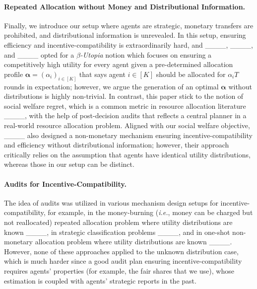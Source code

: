 \paragraph{Repeated Allocation without Money and Distributional Information.}
Finally, we introduce our setup where agents are strategic, monetary transfers are prohibited, and distributional information is unrevealed. In this setup, ensuring efficiency and incentive-compatibility is extraordinarily hard, and ____, ____, and ____ opted for a \textit{$\beta$-Utopia} notion which focuses on ensuring a competitively high utility for every agent given a pre-determined allocation profile $\bm \alpha=(\alpha_i)_{i\in [K]}$ that says agent $i\in [K]$ should be allocated for $\alpha_i T$ rounds in expectation; however, we argue the generation of an optimal $\bm \alpha$ without distributions is highly non-trivial. In contrast, this paper stick to the notion of social welfare regret, which is a common metric in resource allocation literature ____, with the help of post-decision audits that reflects a central planner in a real-world resource allocation problem. Aligned with our social welfare objective, ____ also designed a non-monetary mechanism ensuring incentive-compatibility and efficiency without distributional information; however, their approach critically relies on the assumption that agents have identical utility distributions, whereas those in our setup can be distinct.

\paragraph{Audits for Incentive-Compatibility.}
The idea of audits was utilized in various mechanism design setups for incentive-compatibility, for example, in the money-burning (\textit{i.e.}, money can be charged but not reallocated) repeated allocation problem where utility distributions are known ____, in strategic classification problems ____, and in one-shot non-monetary allocation problem where utility distributions are known ____. However, none of these approaches applied to the unknown distribution case, which is much harder since a good audit plan ensuring incentive-compatibility requires agents' properties (for example, the fair shares that we use), whose estimation is coupled with agents' strategic reports in the past.

